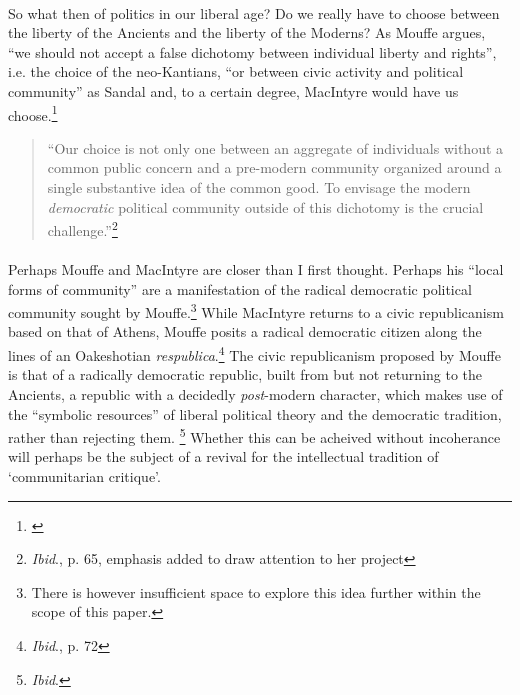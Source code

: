 \documentclass[12pt,a4paper,titlepage]{article}
\begin{document}
\paragraph{}So what then of politics in our liberal age? Do we really have to choose between the liberty of the Ancients and the liberty of the Moderns? As Mouffe argues, ``we should not accept a false dichotomy between individual liberty and rights'', i.e. the choice of the neo-Kantians, ``or between civic activity and political community'' as Sandal and, to a certain degree, MacIntyre would have us choose.\footnote{\cite[p. 65]{mouffe:2005rp}} 

\begin{quote}
``Our choice is not only one between an aggregate of individuals without a common public concern and a pre-modern community organized around a single substantive idea of the common good. To envisage the modern \textit{democratic} political community outside of this dichotomy is the crucial challenge.''\footnote{\textit{Ibid}., p. 65, emphasis added to draw attention to her project}
\end{quote}

\paragraph{}Perhaps Mouffe and MacIntyre are closer than I first thought. Perhaps his ``local forms of community'' are a manifestation of the radical democratic political community sought by Mouffe.\footnote{There is however insufficient space to explore this idea further within the scope of this paper.} While MacIntyre returns to a civic republicanism based on that of Athens, Mouffe posits a radical democratic citizen along the lines of an Oakeshotian \textit{respublica}.\footnote{\textit{Ibid}., p. 72} The civic republicanism proposed by Mouffe is that of a radically democratic republic, built from but not returning to the Ancients, a republic with a decidedly \textit{post}-modern character, which makes use of the ``symbolic resources'' of liberal political theory and the democratic tradition, rather than rejecting them. \footnote{\textit{Ibid}.} Whether this can be acheived without incoherance will perhaps be the subject of a revival for the intellectual tradition of `communitarian critique'.

\newpage
\singlespacing
{}

\end{document}
